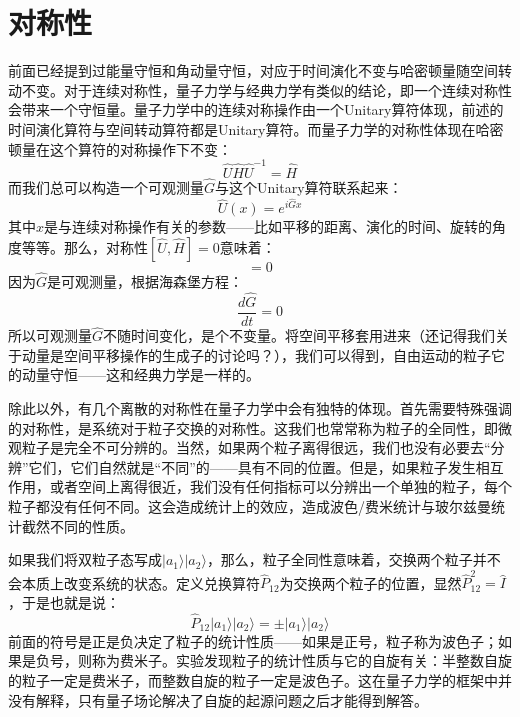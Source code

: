 \documentclass{ctexart}
\begin{document}
\section{对称性}
前面已经提到过能量守恒和角动量守恒，对应于时间演化不变与哈密顿量随空间转动不变。对于连续对称性，量子力学与经典力学有类似的结论，即一个连续对称性会带来一个守恒量。量子力学中的连续对称操作由一个Unitary算符体现，前述的时间演化算符与空间转动算符都是Unitary算符。而量子力学的对称性体现在哈密顿量在这个算符的对称操作下不变：
\begin{equation}
\hat{U}\hat{H}\hat{U}^{-1}=\hat{H}
\end{equation}
而我们总可以构造一个可观测量$\hat{G}$与这个Unitary算符联系起来：
\begin{equation}
\hat{U}(x)=e^{i\hat{G}x}
\end{equation}
其中$x$是与连续对称操作有关的参数——比如平移的距离、演化的时间、旋转的角度等等。那么，对称性$[\hat{U},\hat{H}]=0$意味着：
\begin{equation}
[\hat{G},\hat{H}]=0
\end{equation}
因为$\hat{G}$是可观测量，根据海森堡方程：
\begin{equation}
\frac{d\hat{G}}{dt}=0
\end{equation}
所以可观测量$\hat{G}$不随时间变化，是个不变量。将空间平移套用进来（还记得我们关于动量是空间平移操作的生成子的讨论吗？），我们可以得到，自由运动的粒子它的动量守恒——这和经典力学是一样的。

除此以外，有几个离散的对称性在量子力学中会有独特的体现。首先需要特殊强调的对称性，是系统对于粒子交换的对称性。这我们也常常称为粒子的全同性，即微观粒子是完全不可分辨的。当然，如果两个粒子离得很远，我们也没有必要去“分辨”它们，它们自然就是“不同”的——具有不同的位置。但是，如果粒子发生相互作用，或者空间上离得很近，我们没有任何指标可以分辨出一个单独的粒子，每个粒子都没有任何不同。这会造成统计上的效应，造成波色/费米统计与玻尔兹曼统计截然不同的性质。

如果我们将双粒子态写成$|a_1\rangle|a_2\rangle$，那么，粒子全同性意味着，交换两个粒子并不会本质上改变系统的状态。定义兑换算符$\hat{P}_{12}$为交换两个粒子的位置，显然$\hat{P}_{12}^2=\hat{I}$，于是也就是说：
\begin{equation}
\hat{P}_{12}|a_1\rangle|a_2\rangle=\pm|a_1\rangle|a_2\rangle
\end{equation}
前面的符号是正是负决定了粒子的统计性质——如果是正号，粒子称为波色子；如果是负号，则称为费米子。实验发现粒子的统计性质与它的自旋有关：半整数自旋的粒子一定是费米子，而整数自旋的粒子一定是波色子。这在量子力学的框架中并没有解释，只有量子场论解决了自旋的起源问题之后才能得到解答。
\end{document}
